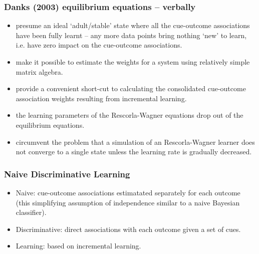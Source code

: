 \begin{frame}
  \frametitle{Danks (2003) equilibrium equations -- verbally} 

  \begin{itemize}

  \item presume an ideal `adult/stable' state where all the
    cue-outcome associations have been fully learnt -- any more data
    points bring nothing `new' to learn, i.e. have zero impact on the
    cue-outcome associations.
    
  \item make it possible to estimate the weights for a system using
    relatively simple matrix algebra.

  \item provide a convenient short-cut to calculating the
    consolidated cue-outcome association weights resulting from
    incremental learning.

  \item the learning parameters of the Rescorla-Wagner equations drop
    out of the equilibrium equations.

  \item circumvent the problem that a simulation of an Rescorla-Wagner
    learner does not converge to a single state unless the learning
    rate is gradually decreased.
    
\end{itemize}

\end{frame}
 
\begin{frame}
  \frametitle{Naive Discriminative Learning}

  \begin{itemize}

  \item Naive: cue-outcome associations estimatated separately for
    each outcome (this simplifying assumption of independence similar to
    a naive Bayesian classifier).

  \item Discriminative: direct associations with each outcome given a set of cues.

  \item Learning: based on incremental learning.

  \end{itemize}

\end{frame}

